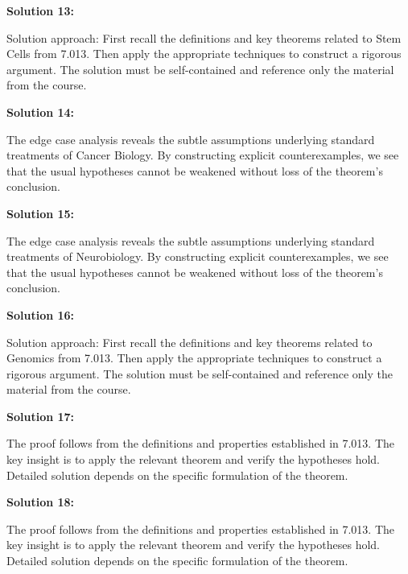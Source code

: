 \documentclass[12pt,a4paper]{exam}
\begin{document}
\vspace{0.5cm}

\textbf{Solution 13:}

Solution approach: First recall the definitions and key theorems related to Stem Cells from 7.013. Then apply the appropriate techniques to construct a rigorous argument. The solution must be self-contained and reference only the material from the course.

\vspace{0.5cm}

\textbf{Solution 14:}

The edge case analysis reveals the subtle assumptions underlying standard treatments of Cancer Biology. By constructing explicit counterexamples, we see that the usual hypotheses cannot be weakened without loss of the theorem's conclusion.

\vspace{0.5cm}

\textbf{Solution 15:}

The edge case analysis reveals the subtle assumptions underlying standard treatments of Neurobiology. By constructing explicit counterexamples, we see that the usual hypotheses cannot be weakened without loss of the theorem's conclusion.

\vspace{0.5cm}

\textbf{Solution 16:}

Solution approach: First recall the definitions and key theorems related to Genomics from 7.013. Then apply the appropriate techniques to construct a rigorous argument. The solution must be self-contained and reference only the material from the course.

\vspace{0.5cm}

\textbf{Solution 17:}

The proof follows from the definitions and properties established in 7.013. The key insight is to apply the relevant theorem and verify the hypotheses hold. Detailed solution depends on the specific formulation of the theorem.

\vspace{0.5cm}

\textbf{Solution 18:}

The proof follows from the definitions and properties established in 7.013. The key insight is to apply the relevant theorem and verify the hypotheses hold. Detailed solution depends on the specific formulation of the theorem.
\end{document}
